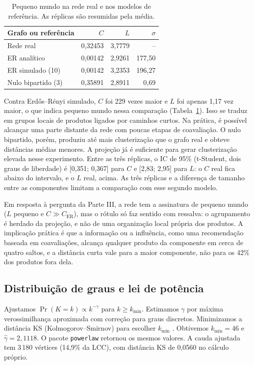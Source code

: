 \documentclass[sigconf,nonacm]{webmedia}
\begin{document}
\begin{table}[tbp]
\centering
\caption{Pequeno mundo na rede real e nos modelos de referência. As réplicas são resumidas pela média.}
\label{tab:pequeno-mundo}
\small
\setlength{\tabcolsep}{4pt}
\begin{tabular}{@{}lrrr@{}}
\toprule
Grafo ou referência & \(C\) & \(L\) & \(\sigma\) \\
\midrule
Rede real & 0,32453 & 3,7779 & -- \\
ER analítico & 0,00142 & 2,9261 & 177,50 \\
ER simulado (10) & 0,00142 & 3,2353 & 196,27 \\
Nulo bipartido (3) & 0,35891 & 2,8911 & 0,69 \\
\bottomrule
\end{tabular}
\end{table}

Contra Erdős--Rényi simulado, \(C\) foi 229 vezes maior e \(L\)
foi apenas 1,17 vez maior, o que indica pequeno mundo nessa
comparação (Tabela~\ref{tab:pequeno-mundo}). Isso se traduz em
grupos locais de produtos ligados por caminhos curtos. Na prática,
é possível alcançar uma parte distante da rede com poucas etapas
de coavaliação. O nulo bipartido, porém, produziu até mais
clusterização que o grafo real e obteve distâncias médias menores.
A projeção já é suficiente para gerar clusterização elevada nesse
experimento. Entre as três réplicas, o IC de 95\% (t-Student, dois
graus de liberdade) é [0,351; 0,367] para \(C\) e [2,83; 2,95] para
\(L\): o \(C\) real fica abaixo do intervalo, e o \(L\) real, acima.
As três réplicas e a diferença de tamanho entre as
componentes limitam a comparação com esse segundo modelo.

Em resposta à pergunta da Parte III, a rede tem a assinatura
de pequeno mundo (\(L\) pequeno e \(C\gg C_{\mathrm{ER}}\)), mas
o rótulo só faz sentido com ressalva: o agrupamento é herdado da
projeção, e não de uma organização local própria dos produtos. A
implicação prática é que a informação ou a influência, como uma
recomendação baseada em coavaliações, alcança qualquer produto da
componente em cerca de quatro saltos, e a distância curta vale
para a maior componente, não para os 42\% dos produtos
fora dela.

\subsection{Distribuição de graus e lei de potência}

Ajustamos \(\Pr(K=k)\propto k^{-\gamma}\) para
\(k\geq k_{\min}\). Estimamos \(\gamma\) por máxima
verossimilhança aproximada com correção para graus discretos.
Minimizamos a distância KS (Kolmogorov--Smirnov) para escolher
\(k_{\min}\) \cite{barabasi2016}.
Obtivemos \(k_{\min}=46\) e \(\hat\gamma=2{,}1118\).
O pacote \texttt{powerlaw} retornou os mesmos valores.
A cauda ajustada tem 3\,180 vértices (14,9\% da LCC), com
distância KS de 0,0560 no cálculo próprio.
\end{document}
